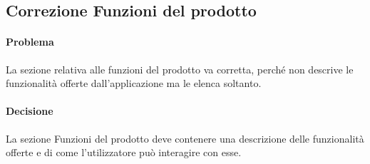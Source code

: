 \subsection{Correzione Funzioni del prodotto} \label{FdP}
\paragraph{Problema}  La sezione relativa alle funzioni del prodotto va corretta, perché non descrive le funzionalità offerte dall'applicazione ma le elenca soltanto.
\paragraph{Decisione} La sezione Funzioni del prodotto deve contenere una descrizione delle funzionalità offerte e di come l'utilizzatore può interagire con esse.
